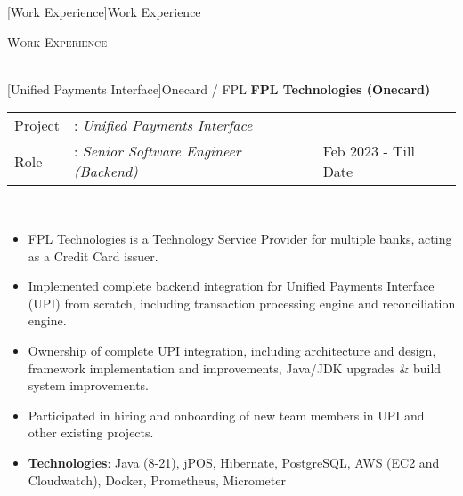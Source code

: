 \documentclass[a4paper]{article}
\newcommand{\lineunder} {
    \vspace*{-8pt} \\
    \hspace*{-18pt} \hrulefill \\
}
\newcommand{\header} [1] {
    {\hspace*{-18pt}\vspace*{6pt} \textsc{#1}}
    \vspace*{-6pt} \lineunder
}
\begin{document}
[Work Experience]{Work Experience}
\header{Work Experience}
\vspace{1mm}

[Unified Payments Interface]{Onecard / FPL}
\textbf{FPL Technologies (Onecard)} \\
\noindent
\begin{tabularx}{\textwidth}{ l l>{\raggedleft\arraybackslash}X}
	Project & : \textit{\href{https://en.wikipedia.org/wiki/Unified_Payments_Interface}{Unified Payments Interface}} &                      \\
	Role    & : \textit{Senior Software Engineer (Backend)}                                                          & Feb 2023 - Till Date \\
\end{tabularx}
\textbf{} \\
\begin{itemize} \itemsep 1pt
	\item FPL Technologies is a Technology Service Provider for multiple banks, acting as a Credit Card issuer.
	\item Implemented complete backend integration for Unified Payments Interface (UPI) from scratch, including transaction processing engine and reconciliation engine.
	\item Ownership of complete UPI integration, including architecture and design, framework implementation and improvements, Java/JDK upgrades \& build system improvements.
	\item Participated in hiring and onboarding of new team members in UPI and other existing projects.
	\item \textbf{Technologies}: Java (8-21), jPOS, Hibernate, PostgreSQL, AWS (EC2 and Cloudwatch), Docker, Prometheus, Micrometer
\end{itemize}
\end{document}
